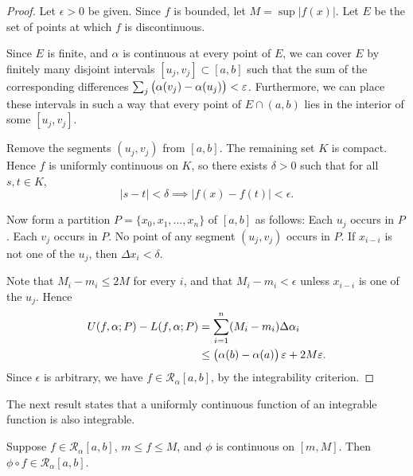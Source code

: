 \begin{proof}
Let $\epsilon>0$ be given. Since $f$ is bounded, let $M=\sup|f(x)|$. Let $E$ be the set of points at which $f$ is discontinuous.

Since $E$ is finite, and $\alpha$ is continuous at every point of $E$, we can cover $E$ by finitely many disjoint intervals $[u_j,v_j]\subset[a,b]$ such that the sum of the corresponding differences $\sum_{j}\left(\alpha(v_j)-\alpha(u_j)\right)<\varepsilon$. Furthermore, we can place these intervals in such a way that every point of $E\cap(a,b)$ lies in the interior of some $[u_j,v_j]$.

Remove the segments $(u_j,v_j)$ from $[a,b]$. The remaining set $K$ is compact. Hence $f$ is uniformly continuous on $K$, so there exists $\delta>0$ such that for all $s,t\in K$,
\[|s-t|<\delta\implies|f(x)-f(t)|<\epsilon.\]

Now form a partition $P=\{x_0,x_1,\dots,x_n\}$ of $[a,b]$ as follows: Each $u_j$ occurs in $P$. Each $v_j$ occurs in $P$. No point of any segment $(u_j,v_j)$ occurs in $P$. If $x_{i-i}$ is not one of the $u_j$, then $\Delta x_i<\delta$.

Note that $M_i-m_i\le 2M$ for every $i$, and that $M_i-m_i<\epsilon$ unless $x_{i-i}$ is one of the $u_j$. Hence
\begin{align*}
U(f,\alpha;P)-L(f,\alpha;P)
&=\sum_{i=1}^{n}(M_i-m_i)\Delta\alpha_i\\
&\le\left(\alpha(b)-\alpha(a)\right)\varepsilon+2M\varepsilon.
\end{align*}
Since $\epsilon$ is arbitrary, we have $f\in\mathcal{R}_\alpha[a,b]$, by the integrability criterion.
\end{proof}

The next result states that a uniformly continuous function of an integrable function is also integrable.

\begin{proposition}\label{prop:integral-composition}
Suppose $f\in \mathcal{R}_\alpha[a,b]$, $m\le f\le M$, and $\phi$ is continuous on $[m,M]$. Then $\phi\circ f\in \mathcal{R}_\alpha[a,b]$.
\end{proposition}

